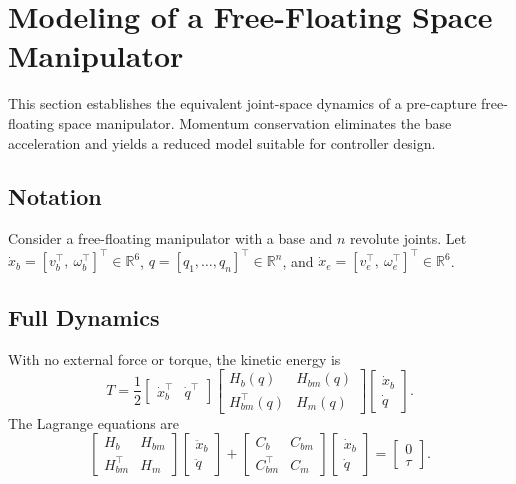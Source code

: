 \section{Modeling of a Free-Floating Space Manipulator}
\label{sec:modeling}
This section establishes the equivalent joint-space dynamics of a pre-capture free-floating space manipulator. Momentum conservation eliminates the base acceleration and yields a reduced model suitable for controller design.
\subsection{Notation}
Consider a free-floating manipulator with a base and $n$ revolute joints. Let $\dot x_b=[v_b^\top,\ \omega_b^\top]^\top\in\mathbb R^6$, $q=[q_1,\ldots,q_n]^\top\in\mathbb R^n$, and $\dot x_e=[v_e^\top,\ \omega_e^\top]^\top\in\mathbb R^6$.
\subsection{Full Dynamics}
With no external force or torque, the kinetic energy is
\begin{equation}T=\frac12\begin{bmatrix}\dot x_b^\top & \dot q^\top\end{bmatrix}\begin{bmatrix}H_b(q)&H_{bm}(q)\\H_{bm}^\top(q)&H_m(q)\end{bmatrix}\begin{bmatrix}\dot x_b\\\dot q\end{bmatrix}.\label{eq:kinetic_energy_ffsm}\end{equation}
The Lagrange equations are
\begin{equation}\begin{bmatrix}H_b&H_{bm}\\H_{bm}^\top&H_m\end{bmatrix}\begin{bmatrix}\ddot x_b\\\ddot q\end{bmatrix}+\begin{bmatrix}C_b&C_{bm}\\C_{bm}^\top&C_m\end{bmatrix}\begin{bmatrix}\dot x_b\\\dot q\end{bmatrix}=\begin{bmatrix}0\\\tau\end{bmatrix}.\label{eq:full_ffsm_dynamics}\end{equation}
